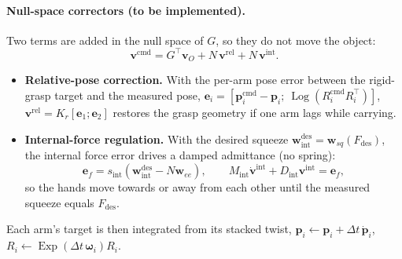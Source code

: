 \documentclass[11pt,a4paper]{article}
\newcommand{\vect}[1]{\boldsymbol{#1}}
\DeclareMathOperator{\Log}{Log}
\DeclareMathOperator{\Exp}{Exp}
\begin{document}
\paragraph{Null-space correctors (to be implemented).} Two terms are added in the null space of $G$, so they do not
move the object:
\begin{equation}
  \vect v^{\mathrm{cmd}} = G^\top\vect v_O + N\,\vect v^{\mathrm{rel}} + N\,\vect v^{\mathrm{int}} .
\end{equation}
\begin{itemize}
  \item \textbf{Relative-pose correction.} With the per-arm pose error between the rigid-grasp target and the measured
        pose, $\vect e_i=\left[\vect p_i^{\mathrm{cmd}}-\vect p_i;\ \Log(R_i^{\mathrm{cmd}}R_i^\top)\right]$,
        $\vect v^{\mathrm{rel}}=K_r[\vect e_1;\vect e_2]$ restores the grasp geometry if one arm lags while carrying.
  \item \textbf{Internal-force regulation.} With the desired squeeze $\vect w_{\mathrm{int}}^{\mathrm{des}}=\vect w_{sq}(F_{\mathrm{des}})$,
        the internal force error drives a damped admittance (no spring):
        \begin{equation}
          \vect e_f=s_{\mathrm{int}}\left(\vect w_{\mathrm{int}}^{\mathrm{des}}-N\vect w_{ee}\right),\qquad
          M_{\mathrm{int}}\dot{\vect v}^{\mathrm{int}}+D_{\mathrm{int}}\vect v^{\mathrm{int}}=\vect e_f ,
        \end{equation}
        so the hands move towards or away from each other until the measured squeeze equals $F_{\mathrm{des}}$.
\end{itemize}
Each arm's target is then integrated from its stacked twist, $\vect p_i\leftarrow\vect p_i+\Delta t\,\dot{\vect p}_i$,
$R_i\leftarrow\Exp(\Delta t\,\vect\omega_i)R_i$.
\end{document}
